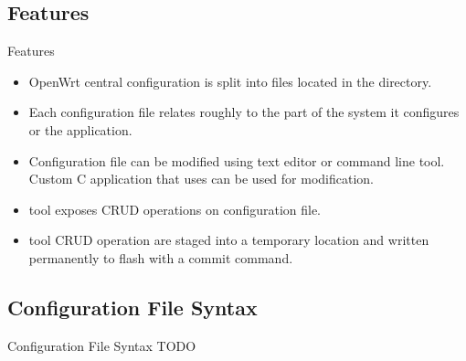 \subsection{Features}
\begin{frame}{Features}
    \begin{itemize}[<+-|alert@+>]
        \item OpenWrt central configuration is split into files located in the  directory.
        \item Each configuration file relates roughly to the part of the system it configures or the application.
        \item Configuration file can be modified using text editor or  command line tool. Custom C application that uses  can be used for modification.
        \item {} tool exposes CRUD operations on configuration file.
        \item {} tool CRUD operation are staged into a temporary location and written permanently to flash with a commit command.
    \end{itemize}
\end{frame}

\subsection{Configuration File Syntax}
\begin{frame}{Configuration File Syntax}
    TODO
\end{frame}
